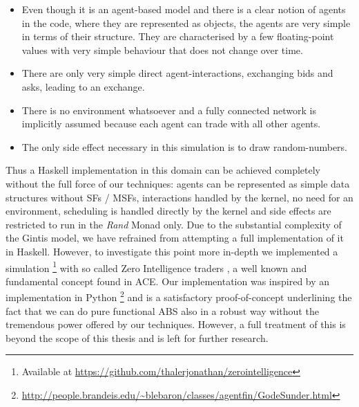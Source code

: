 \begin{itemize}
	\item Even though it is an agent-based model and there is a clear notion of agents in the code, where they are represented as objects, the agents are very simple in terms of their structure. They are characterised by a few floating-point values with very simple behaviour that does not change over time.

	\item There are only very simple direct agent-interactions, exchanging bids and asks, leading to an exchange.

	\item There is no environment whatsoever and a fully connected network is implicitly assumed because each agent can trade with all other agents.
	
	\item The only side effect necessary in this simulation is to draw random-numbers.
\end{itemize}

Thus a Haskell implementation in this domain can be achieved completely without the full force of our techniques: agents can be represented as simple data structures without SFs / MSFs, interactions handled by the kernel, no need for an environment, scheduling is handled directly by the kernel and side effects are restricted to run in the \textit{Rand} Monad only. Due to the substantial complexity of the Gintis model, we have refrained from attempting a full implementation of it in Haskell. However, to investigate this point more in-depth we implemented a simulation \footnote{Available at \url{https://github.com/thalerjonathan/zerointelligence}} with so called Zero Intelligence traders \cite{gode_allocative_1993}, a well known and fundamental concept found in ACE. Our implementation was inspired by an implementation in Python \footnote{\url{http://people.brandeis.edu/~blebaron/classes/agentfin/GodeSunder.html}} and is a satisfactory proof-of-concept underlining the fact that we can do pure functional ABS also in a robust way without the tremendous power offered by our techniques. However, a full treatment of this is beyond the scope of this thesis and is left for further research.

